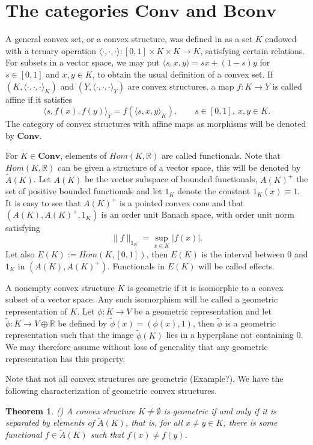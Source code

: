 \documentclass[12pt]{article}
\newtheorem{thm}{Theorem}
\theoremstyle{remark}
\newcommand{\<}{\langle}
\def\>{\rangle}
\newcommand{\ct}[1]{\mathbf{#1}}
\begin{document}
\section{The categories $\ct{Conv}$ and $\ct{Bconv}$}


A general convex set, or a convex structure, was defined in \cite{gudder} as a set $K$ endowed with a ternary operation $\<\cdot,\cdot,\cdot\>: [0,1]\times K\times K\to K$,
 satisfying certain relations. For subsets in a vector space, we may put $\<s,x,y\>=sx+(1-s)y$ for $s\in [0,1]$ and $x,y\in K$, to obtain the usual definition of a convex set.  If $(K,\<\cdot,\cdot,\cdot\>_K)$ and $(Y,\<\cdot,\cdot,\cdot\>_Y)$ are convex structures, a map $f:K\to Y$ is called affine if it satisfies
\[
\<s,f(x),f(y)\>_Y=f(\<s,x,y\>_K),\qquad s\in [0,1],\ x,y\in K.
\]
The category of convex structures with affine maps as morphisms will be denoted by $\ct{Conv}$. 

For $K\in \ct{Conv}$, elements of $Hom(K,\mathbb R)$ are called functionals. Note that $Hom(K,\mathbb R)$ can be given a structure of a vector space, this will be denoted by $\widetilde A(K)$.  Let $A(K)$ be the vector subspace of bounded functionals, $A(K)^+$ the set of positive bounded functionals and let $1_K$ denote the constant $1_K(x)\equiv 1$. It is easy to see that $A(K)^+$ is a pointed convex cone and that $(A(K),A(K)^+,1_K)$ is an  order unit Banach space, with order unit norm satisfying
\[
\|f\|_{1_K}=\sup_{x\in K} |f(x)|.
\]
Let also $E(K):=Hom(K,[0,1])$, then $E(K)$ is the interval between 0 and $1_K$ in $(A(K),A(K)^+)$. Functionals in  $E(K)$ will be called effects.





A nonempty convex structure $K$ is geometric if it is isomorphic to a convex subset of a vector space. Any such isomorphism will be called a geometric representation of $K$.
Let $\phi:K\to V$ be a geometric representation and let $\tilde \phi:K\to V\oplus \mathbb R$ be defined by $\tilde \phi(x)=(\phi(x),1)$, then $\tilde \phi$ is a geometric 
representation  such that the image $\tilde \phi(K)$ lies in a hyperplane not containing 0. We may therefore assume without loss of generality  that any geometric representation has this property.

 Note that not all convex structures are geometric (Example?). We have the following characterization of geometric convex structures.
\begin{thm}(\cite[Thm. 2.2]{gudder}) \label{thm:gudder} A convex structure $K\neq \emptyset$ is geometric if and only if it is separated by elements of $\widetilde A(K)$, 
that is, for all $x\ne y\in K$, there is some functional $f\in \widetilde A(K)$ such that $f(x)\ne f(y)$. 
\end{thm}
\end{document}
